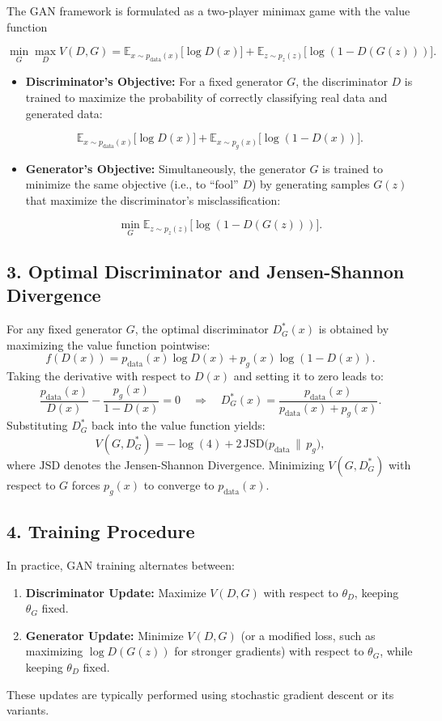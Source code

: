\documentclass{article}
\begin{document}
The GAN framework is formulated as a two-player minimax game with the value function

\[
\min_{G} \max_{D} V(D,G) = \mathbb{E}_{x\sim p_{\text{data}}(x)}\big[\log D(x)\big] + \mathbb{E}_{z\sim p_z(z)}\big[\log (1 - D(G(z)))\big].
\]

\begin{itemize}
    \item \textbf{Discriminator’s Objective:} For a fixed generator $G$, the discriminator $D$ is trained to maximize the probability of correctly classifying real data and generated data:

    \[
    \mathbb{E}_{x\sim p_{\text{data}}(x)}\big[\log D(x)\big] + \mathbb{E}_{x\sim p_g(x)}\big[\log (1 - D(x))\big].
    \]

    \item \textbf{Generator’s Objective:} Simultaneously, the generator $G$ is trained to minimize the same objective (i.e., to “fool” $D$) by generating samples $G(z)$ that maximize the discriminator's misclassification:

    \[
    \min_{G} \mathbb{E}_{z\sim p_z(z)}\big[\log (1 - D(G(z)))\big].
    \]
\end{itemize}

\subsection*{3. Optimal Discriminator and Jensen-Shannon Divergence}

For any fixed generator $G$, the optimal discriminator $D^*_G(x)$ is obtained by maximizing the value function pointwise:
\[
f(D(x)) = p_{\text{data}}(x) \log D(x) + p_g(x) \log (1 - D(x)).
\]
Taking the derivative with respect to $D(x)$ and setting it to zero leads to:
\[
\frac{p_{\text{data}}(x)}{D(x)} - \frac{p_g(x)}{1-D(x)} = 0 \quad \Longrightarrow \quad D^*_G(x) = \frac{p_{\text{data}}(x)}{p_{\text{data}}(x) + p_g(x)}.
\]
Substituting $D^*_G$ back into the value function yields:
\[
V(G, D^*_G) = -\log(4) + 2\, \mathrm{JSD}\big(p_{\text{data}} \,\|\, p_g\big),
\]
where $\mathrm{JSD}$ denotes the Jensen-Shannon Divergence. Minimizing $V(G, D^*_G)$ with respect to $G$ forces $p_g(x)$ to converge to $p_{\text{data}}(x)$.

\subsection*{4. Training Procedure}

In practice, GAN training alternates between:
\begin{enumerate}
    \item \textbf{Discriminator Update:} Maximize $V(D, G)$ with respect to $\theta_D$, keeping $\theta_G$ fixed.
    \item \textbf{Generator Update:} Minimize $V(D, G)$ (or a modified loss, such as maximizing $\log D(G(z))$ for stronger gradients) with respect to $\theta_G$, while keeping $\theta_D$ fixed.
\end{enumerate}
These updates are typically performed using stochastic gradient descent or its variants.
\end{document}
